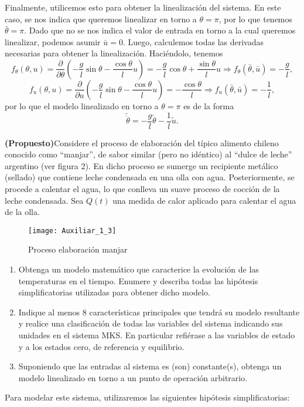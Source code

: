 \documentclass[
  11pt,
  letterpaper,
   addpoints,
   answers
  ]{exam}
\begin{document}
\begin{questions}
\begin{solution}
Finalmente, utilicemos esto para obtener la linealización del sistema. En este caso, se nos indica que queremos linealizar en torno a \(\theta = \pi\), por lo que tenemos \(\bar{\theta} = \pi\). Dado que no se nos indica el valor de entrada en torno a la cual queremos linealizar, podemos asumir \(\bar{u} = 0\). Luego, calculemos todas las derivadas necesarias para obtener la linealización. Haciéndolo, tenemos
\begin{equation}
    f_{\theta} (\theta, u) = \frac{\partial}{\partial \theta} \left( -\frac{g}{l} \sin \theta - \frac{\cos \theta}{l} u \right) = -\frac{g}{l} \cos \theta + \frac{\sin \theta}{l} u \Rightarrow f_{\theta} (\bar{\theta}, \bar{u}) = -\frac{g}{l}, \tag{37}
\end{equation}
\begin{equation}
    f_{u} (\theta, u) = \frac{\partial}{\partial u} \left( -\frac{g}{l} \sin \theta - \frac{\cos \theta}{l} u \right) = -\frac{\cos \theta}{l} \Rightarrow f_{u} (\bar{\theta}, \bar{u}) = -\frac{1}{l}, \tag{38}
\end{equation}
por lo que el modelo linealizado en torno a \(\theta = \pi\) es de la forma
\begin{equation}
    \tilde{\ddot{\theta}} = -\frac{g}{l} \tilde{\theta} - \frac{1}{l} \tilde{u}. \tag{39}
\end{equation}
\end{solution}
\question \textbf{(Propuesto)}Considere el proceso de elaboración del típico alimento chileno conocido como ``manjar'', de sabor similar (pero no idéntico) al ``dulce de leche'' argentino (ver figura 2). En dicho proceso se sumerge un recipiente metálico (sellado) que contiene leche condensada en una olla con agua. Posteriormente, se procede a calentar el agua, lo que conlleva un suave proceso de cocción de la leche condensada. Sea $Q(t)$ una medida de calor aplicado para calentar el agua de la olla.
\begin{figure}[h!]
    \centering
    \texttt{[image: Auxiliar\_1\_3]}
    \caption{Proceso elaboración manjar}
\end{figure}
\begin{enumerate}
    \item Obtenga un modelo matemático que caracterice la evolución de las temperaturas en el tiempo. Enumere y describa todas las hipótesis simplificatorias utilizadas para obtener dicho modelo.
    \item Indique al menos 8 características principales que tendrá su modelo resultante y realice una clasificación de todas las variables del sistema indicando sus unidades en el sistema MKS. En particular refiérase a las variables de estado y a los estados cero, de referencia y equilibrio.
    \item Suponiendo que las entradas al sistema es (son) constante(s), obtenga un modelo linealizado en torno a un punto de operación arbitrario.
\end{enumerate}
\begin{solution}
    Para modelar este sistema, utilizaremos las siguientes hipótesis simplificatorias:


\end{solution}
\end{questions}
\end{document}
